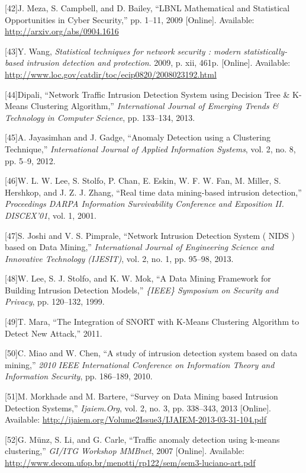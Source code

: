 \documentclass[11pt,]{article}
\begin{document}
{[}42{]}J. Meza, S. Campbell, and D. Bailey, ``LBNL Mathematical and
Statistical Opportunities in Cyber Security,'' pp. 1--11, 2009
{[}Online{]}. Available: \url{http://arxiv.org/abs/0904.1616}

{[}43{]}Y. Wang, \emph{Statistical techniques for network security :
modern statistically-based intrusion detection and protection}. 2009, p.
xii, 461p. {[}Online{]}. Available:
\url{http://www.loc.gov/catdir/toc/ecip0820/2008023192.html}

{[}44{]}Dipali, ``Network Traffic Intrusion Detection System using
Decision Tree \& K-Means Clustering Algorithm,'' \emph{International
Journal of Emerging Trends \& Technology in Computer Science}, pp.
133--134, 2013.

{[}45{]}A. Jayasimhan and J. Gadge, ``Anomaly Detection using a
Clustering Technique,'' \emph{International Journal of Applied
Information Systems}, vol. 2, no. 8, pp. 5--9, 2012.

{[}46{]}W. L. W. Lee, S. Stolfo, P. Chan, E. Eskin, W. F. W. Fan, M.
Miller, S. Hershkop, and J. Z. J. Zhang, ``Real time data mining-based
intrusion detection,'' \emph{Proceedings DARPA Information Survivability
Conference and Exposition II. DISCEX'01}, vol. 1, 2001.

{[}47{]}S. Joshi and V. S. Pimprale, ``Network Intrusion Detection
System ( NIDS ) based on Data Mining,'' \emph{International Journal of
Engineering Science and Innovative Technology (IJESIT)}, vol. 2, no. 1,
pp. 95--98, 2013.

{[}48{]}W. Lee, S. J. Stolfo, and K. W. Mok, ``A Data Mining Framework
for Building Intrusion Detection Models,'' \emph{\{IEEE\} Symposium on
Security and Privacy}, pp. 120--132, 1999.

{[}49{]}T. Mara, ``The Integration of SNORT with K-Means Clustering
Algorithm to Detect New Attack,'' 2011.

{[}50{]}C. Miao and W. Chen, ``A study of intrusion detection system
based on data mining,'' \emph{2010 IEEE International Conference on
Information Theory and Information Security}, pp. 186--189, 2010.

{[}51{]}M. Morkhade and M. Bartere, ``Survey on Data Mining based
Intrusion Detection Systems,'' \emph{Ijaiem.Org}, vol. 2, no. 3, pp.
338--343, 2013 {[}Online{]}. Available:
\url{http://ijaiem.org/Volume2Issue3/IJAIEM-2013-03-31-104.pdf}

{[}52{]}G. Münz, S. Li, and G. Carle, ``Traffic anomaly detection using
k-means clustering,'' \emph{GI/ITG Workshop MMBnet}, 2007 {[}Online{]}.
Available:
\url{http://www.decom.ufop.br/menotti/rp122/sem/sem3-luciano-art.pdf}
\end{document}
